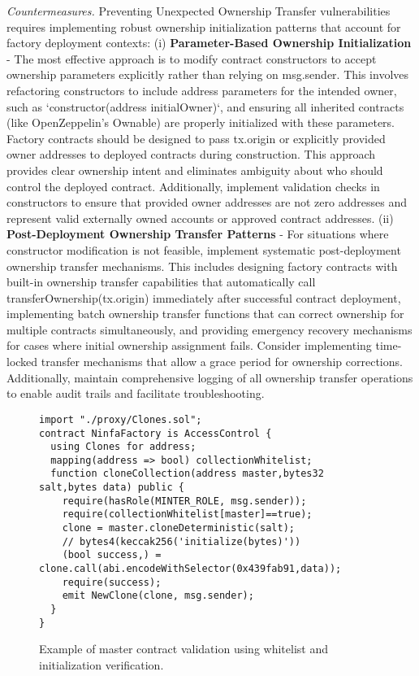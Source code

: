 \documentclass[acmsmall, screen]{acmart}
\begin{document}
	\textit{Countermeasures.} Preventing Unexpected Ownership Transfer vulnerabilities requires
	implementing robust ownership initialization patterns that account for factory deployment
	contexts: (i) \textbf{Parameter-Based Ownership Initialization} - The most effective approach is
	to modify contract constructors to accept ownership parameters explicitly rather than relying on
	msg.sender. This involves refactoring constructors to include address parameters for the intended
	owner, such as `constructor(address initialOwner)`, and ensuring all inherited contracts (like OpenZeppelin's
	Ownable) are properly initialized with these parameters. Factory contracts should be designed to
	pass tx.origin or explicitly provided owner addresses to deployed contracts during construction.
	This approach provides clear ownership intent and eliminates ambiguity about who should control
	the deployed contract. Additionally, implement validation checks in constructors to ensure that
	provided owner addresses are not zero addresses and represent valid externally owned accounts or
	approved contract addresses. (ii) \textbf{Post-Deployment Ownership Transfer Patterns} - For
	situations where constructor modification is not feasible, implement systematic post-deployment ownership
	transfer mechanisms. This includes designing factory contracts with built-in ownership transfer
	capabilities that automatically call transferOwnership(tx.origin) immediately after successful contract
	deployment, implementing batch ownership transfer functions that can correct ownership for
	multiple contracts simultaneously, and providing emergency recovery mechanisms for cases where initial
	ownership assignment fails. Consider implementing time-locked transfer mechanisms that allow a
	grace period for ownership corrections. Additionally, maintain comprehensive logging of all
	ownership transfer operations to enable audit trails and facilitate troubleshooting.

	\begin{figure}[htbp]
		\begin{minipage}{0.95\linewidth}
			\begin{lstlisting}
import "./proxy/Clones.sol";
contract NinfaFactory is AccessControl {
  using Clones for address;
  mapping(address => bool) collectionWhitelist;
  function cloneCollection(address master,bytes32 salt,bytes data) public {
    require(hasRole(MINTER_ROLE, msg.sender));
    require(collectionWhitelist[master]==true);
    clone = master.cloneDeterministic(salt);
    // bytes4(keccak256('initialize(bytes)'))
    (bool success,) = clone.call(abi.encodeWithSelector(0x439fab91,data));
    require(success);
    emit NewClone(clone, msg.sender);
  }
}
			\end{lstlisting}
		\end{minipage}
		\caption{Example of master contract validation using whitelist and initialization
		verification.}
		\label{lst:checkmaster}
	\end{figure}
\end{document}
